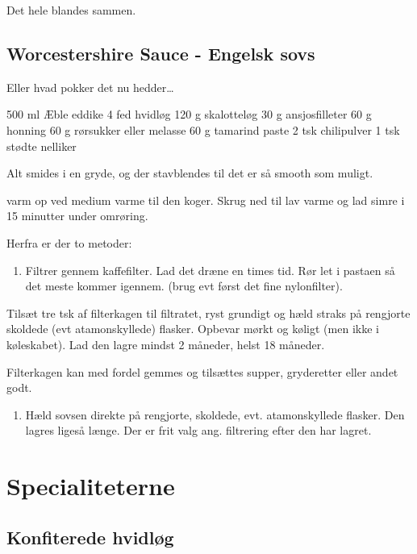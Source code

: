 \documentclass[
]{book}
\providecommand{\tightlist}{%
  \setlength{\itemsep}{0pt}\setlength{\parskip}{0pt}}
\begin{document}
Det hele blandes sammen.

\section{Worcestershire Sauce - Engelsk sovs}\label{worcestershire-sauce---engelsk-sovs}

Eller hvad pokker det nu hedder\ldots{}

500 ml Æble eddike
4 fed hvidløg
120 g skalotteløg
30 g ansjosfilleter
60 g honning
60 g rørsukker eller melasse
60 g tamarind paste
2 tsk chilipulver
1 tsk stødte nelliker

Alt smides i en gryde, og der stavblendes til det er så smooth som muligt.

varm op ved medium varme til den koger. Skrug ned til lav varme og lad simre
i 15 minutter under omrøring.

Herfra er der to metoder:

\begin{enumerate}
\def\labelenumi{\arabic{enumi}.}
\tightlist
\item
  Filtrer gennem kaffefilter. Lad det dræne en times tid. Rør let i pastaen
  så det meste kommer igennem. (brug evt først det fine nylonfilter).
\end{enumerate}

Tilsæt tre tsk af filterkagen til filtratet, ryst grundigt og hæld straks på
rengjorte skoldede (evt atamonskyllede) flasker. Opbevar mørkt og køligt
(men ikke i køleskabet). Lad den lagre mindst 2 måneder, helst 18 måneder.

Filterkagen kan med fordel gemmes og tilsættes supper, gryderetter eller andet godt.

\begin{enumerate}
\def\labelenumi{\arabic{enumi}.}
\setcounter{enumi}{1}
\tightlist
\item
  Hæld sovsen direkte på rengjorte, skoldede, evt. atamonskyllede flasker.
  Den lagres ligeså længe. Der er frit valg ang. filtrering efter den har lagret.
\end{enumerate}

\chapter{Specialiteterne}\label{specialiteterne}

\section{Konfiterede hvidløg}\label{konfiterede-hvidluxf8g}
\end{document}
